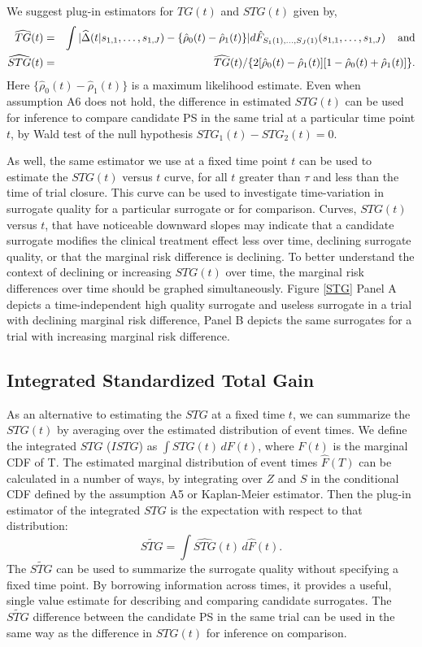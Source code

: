 \documentclass[times, doublespace]{simauth}
\begin{document}
We suggest plug-in estimators for $TG(t)$ and $STG(t)$ given by, 
\begin{eqnarray}
\widehat{TG}(t)&=&\int{|\widehat{\Delta}(t|s_{1,1}, \dots, s_{1,J}) -\{\hat{\rho}_0(t) -\hat{\rho}_1(t)\}|d\hat{F}_{S_1(1), \ldots, S_J(1)}(s_{1,1}, \dots, s_{1,J})} \hspace{4mm} \mbox{and} \label{TG} \\
\widehat{STG}(t)&=&\widehat{TG}(t)/\{2[\hat{\rho}_0(t) - \hat{\rho}_1(t)][1-\hat{\rho}_0(t) + \hat{\rho}_1(t)]\}.
\end{eqnarray}
Here $\{\hat{\rho}_0(t) -\hat{\rho}_1(t)\}$ is a maximum likelihood estimate. Even when assumption A6 does not hold, the difference in estimated $STG(t)$ can be used for inference to compare candidate PS in the same trial at a particular time point $t$, by Wald test of the null hypothesis $STG_1(t)-STG_2(t)=0$. 

As well, the same estimator we use at a fixed time point $t$ can be used to estimate the $STG(t)$ versus $t$ curve, for all $t$ greater than $\tau$ and less than the time of trial closure. This curve can be used to investigate time-variation in surrogate quality for a particular surrogate or for comparison. Curves, $STG(t)$ versus $t$, that have noticeable downward slopes may indicate that a candidate surrogate modifies the clinical treatment effect less over time, declining surrogate quality, or that the marginal risk difference is declining. To better understand the context of declining or increasing $STG(t)$ over time, the marginal risk differences over time should be graphed simultaneously. Figure \ref{STG} Panel A depicts a time-independent high quality surrogate and useless surrogate in a trial with declining marginal risk difference, Panel B depicts the same surrogates for a trial with increasing marginal risk difference. 

\subsection{Integrated Standardized Total Gain} \label{ISTG}
As an alternative to estimating the $STG$ at a fixed time $t$, we can summarize the $STG(t)$ by averaging over the estimated distribution of event times. We define the integrated $STG$ ($ISTG$) as $\int STG(t) \, dF(t)$, where $F(t)$ is the marginal CDF of T. The estimated marginal distribution of event times $\hat{F}(T)$ can be calculated in a number of ways, by integrating over $Z$ and $S$ in the conditional CDF defined by the assumption A5 or Kaplan-Meier estimator. Then the plug-in estimator of the integrated $STG$ is the expectation with respect to that distribution:
\[
 \widetilde{STG} = \int \widehat{STG}(t) \, d \hat{F}(t). 
\]
The $\widetilde{STG}$ can be used to summarize the surrogate quality without specifying a fixed time point. By borrowing information across times, it provides a useful, single value estimate for describing and comparing candidate surrogates. The $\widetilde{STG}$ difference between the candidate PS in the same trial can be used in the same way as the difference in $STG(t)$ for inference on comparison.
\end{document}
